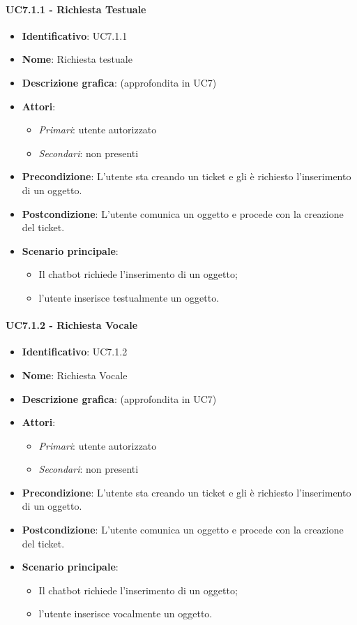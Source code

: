 \paragraph{UC7.1.1 - Richiesta Testuale}
\begin{itemize}
   \item \textbf{Identificativo}: UC7.1.1
   \item \textbf{Nome}: Richiesta testuale
   \item \textbf{Descrizione grafica}: (approfondita in UC7)
   \item \textbf{Attori}:
   \begin{itemize} 
       \item \textit{Primari}: utente autorizzato
       \item \textit{Secondari}: non presenti
   \end{itemize}
       \item \textbf{Precondizione}: L'utente sta creando un ticket e gli è richiesto l'inserimento di un oggetto.
       \item \textbf{Postcondizione}: L'utente comunica un oggetto e procede con la creazione del ticket. 
    \item \textbf{Scenario principale}: 
       \begin{itemize}
           \item Il chatbot richiede l'inserimento di un oggetto;
           \item l'utente inserisce testualmente un oggetto.
       \end{itemize}
\end{itemize}

\paragraph{UC7.1.2 - Richiesta Vocale}
\begin{itemize}
   \item \textbf{Identificativo}: UC7.1.2
   \item \textbf{Nome}: Richiesta Vocale
   \item \textbf{Descrizione grafica}: (approfondita in UC7)
   \item \textbf{Attori}:
   \begin{itemize} 
       \item \textit{Primari}: utente autorizzato
       \item \textit{Secondari}: non presenti
   \end{itemize}
       \item \textbf{Precondizione}: L'utente sta creando un ticket e gli è richiesto l'inserimento di un oggetto.
       \item \textbf{Postcondizione}: L'utente comunica un oggetto e procede con la creazione del ticket. 
    \item \textbf{Scenario principale}: 
       \begin{itemize}  
        \item Il chatbot richiede l'inserimento di un oggetto;
        \item l'utente inserisce vocalmente un oggetto.
       \end{itemize}
\end{itemize}


